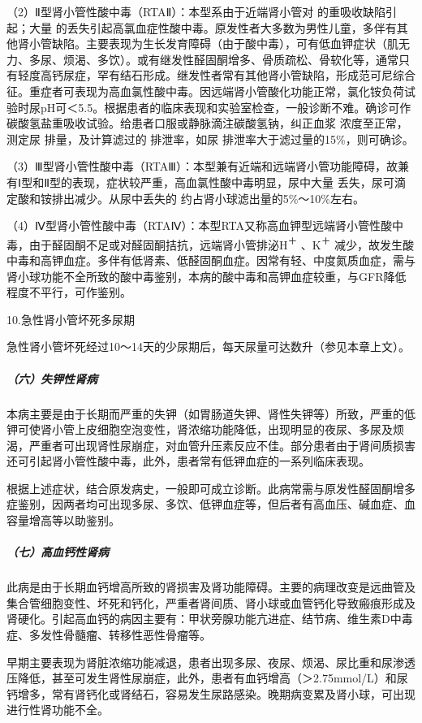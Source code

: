 （2）Ⅱ型肾小管性酸中毒（RTAⅡ）：本型系由于近端肾小管对
的重吸收缺陷引起；大量
的丢失引起高氯血症性酸中毒。原发性者大多数为男性儿童，多伴有其他肾小管缺陷。主要表现为生长发育障碍（由于酸中毒），可有低血钾症状（肌无力、多尿、烦渴、多饮）。或有继发性醛固酮增多、骨质疏松、骨软化等，通常只有轻度高钙尿症，罕有结石形成。继发性者常有其他肾小管缺陷，形成范可尼综合征。重症者可表现为高血氯性酸中毒。因远端肾小管酸化功能正常，氯化铵负荷试验时尿pH可＜5.5。根据患者的临床表现和实验室检查，一般诊断不难。确诊可作碳酸氢盐重吸收试验。给患者口服或静脉滴注碳酸氢钠，纠正血浆
浓度至正常，测定尿
排量，及计算滤过的
排泄率，如尿
排泄率大于滤过量的15\%，则可确诊。

（3）Ⅲ型肾小管性酸中毒（RTAⅢ）：本型兼有近端和远端肾小管功能障碍，故兼有Ⅰ型和Ⅱ型的表现，症状较严重，高血氯性酸中毒明显，尿中大量
丢失，尿可滴定酸和铵排出减少。从尿中丢失的
约占肾小球滤出量的5\%～10\%左右。

（4）Ⅳ型肾小管性酸中毒（RTAⅣ）：本型RTA又称高血钾型远端肾小管性酸中毒，由于醛固酮不足或对醛固酮拮抗，远端肾小管排泌H\textsuperscript{＋}
、K\textsuperscript{＋}
减少，故发生酸中毒和高钾血症。多伴有低肾素、低醛固酮血症。因常有轻、中度氮质血症，需与肾小球功能不全所致的酸中毒鉴别，本病的酸中毒和高钾血症较重，与GFR降低程度不平行，可作鉴别。

\hypertarget{text00273.htmlux5cux23CHP35-2-2-2-2-5-10}{}
10.急性肾小管坏死多尿期

急性肾小管坏死经过10～14天的少尿期后，每天尿量可达数升（参见本章上文）。

\subparagraph{（六）失钾性肾病}

本病主要是由于长期而严重的失钾（如胃肠道失钾、肾性失钾等）所致，严重的低钾可使肾小管上皮细胞空泡变性，肾浓缩功能降低，出现明显的夜尿、多尿及烦渴，严重者可出现肾性尿崩症，对血管升压素反应不佳。部分患者由于肾间质损害还可引起肾小管性酸中毒，此外，患者常有低钾血症的一系列临床表现。

根据上述症状，结合原发病史，一般即可成立诊断。此病常需与原发性醛固酮增多症鉴别，因两者均可出现多尿、多饮、低钾血症等，但后者有高血压、碱血症、血容量增高等以助鉴别。

\subparagraph{（七）高血钙性肾病}

此病是由于长期血钙增高所致的肾损害及肾功能障碍。主要的病理改变是远曲管及集合管细胞变性、坏死和钙化，严重者肾间质、肾小球或血管钙化导致瘢痕形成及肾硬化。引起高血钙的病因主要有：甲状旁腺功能亢进症、结节病、维生素D中毒症、多发性骨髓瘤、转移性恶性骨瘤等。

早期主要表现为肾脏浓缩功能减退，患者出现多尿、夜尿、烦渴、尿比重和尿渗透压降低，甚至可发生肾性尿崩症，此外，患者有血钙增高（＞2.75mmol/L）和尿钙增多，常有肾钙化或肾结石，容易发生尿路感染。晚期病变累及肾小球，可出现进行性肾功能不全。

